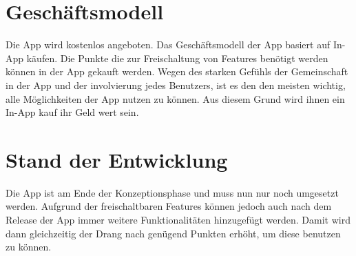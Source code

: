 \section{Geschäftsmodell}

Die App wird kostenlos angeboten. Das Geschäftsmodell der App basiert auf In-App käufen. Die Punkte die zur Freischaltung von Features benötigt werden können in der App gekauft werden. Wegen des starken Gefühls der Gemeinschaft in der App und der involvierung jedes Benutzers, ist es den den meisten wichtig, alle Möglichkeiten der App nutzen zu können. Aus diesem Grund wird ihnen ein In-App kauf ihr Geld wert sein.

\section{Stand der Entwicklung}

Die App ist am Ende der Konzeptionsphase und muss nun nur noch umgesetzt werden. Aufgrund der freischaltbaren Features können jedoch auch nach dem Release der App immer weitere Funktionalitäten hinzugefügt werden. Damit wird dann gleichzeitig der Drang nach genügend Punkten erhöht, um diese benutzen zu können.
